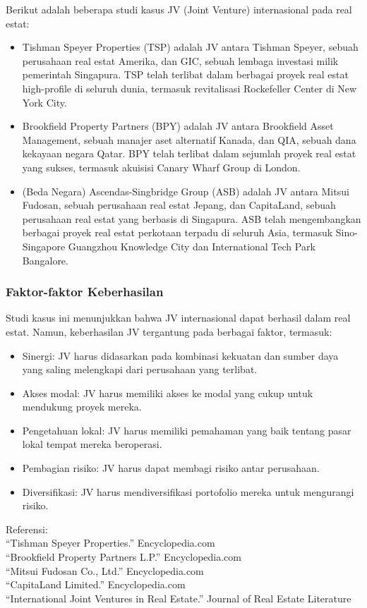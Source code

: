 \documentclass[12pt]{article}
\begin{document}
Berikut adalah beberapa studi kasus JV (Joint Venture) internasional pada real estat:
\begin{itemize}
  \item Tishman Speyer Properties (TSP) adalah JV antara Tishman Speyer, sebuah perusahaan real estat Amerika, dan GIC, sebuah lembaga investasi milik pemerintah Singapura. TSP telah terlibat dalam berbagai proyek real estat high-profile di seluruh dunia, termasuk revitalisasi Rockefeller Center di New York City.
  \item  Brookfield Property Partners (BPY) adalah JV antara Brookfield Asset Management, sebuah manajer aset alternatif Kanada, dan QIA, sebuah dana kekayaan negara Qatar. BPY telah terlibat dalam sejumlah proyek real estat yang sukses, termasuk akuisisi Canary Wharf Group di London.
  \item (Beda Negara) Ascendas-Singbridge Group (ASB) adalah JV antara Mitsui Fudosan, sebuah perusahaan real estat Jepang, dan CapitaLand, sebuah perusahaan real estat yang berbasis di Singapura. ASB telah mengembangkan berbagai proyek real estat perkotaan terpadu di seluruh Asia, termasuk Sino-Singapore Guangzhou Knowledge City dan International Tech Park Bangalore.
  
\end{itemize}

\subsubsection*{Faktor-faktor Keberhasilan}

Studi kasus ini menunjukkan bahwa JV internasional dapat berhasil dalam real estat. Namun, keberhasilan JV tergantung pada berbagai faktor, termasuk:
\begin{itemize}
  
  \item Sinergi: JV harus didasarkan pada kombinasi kekuatan dan sumber daya yang saling melengkapi dari perusahaan yang terlibat.
  \item Akses modal: JV harus memiliki akses ke modal yang cukup untuk mendukung proyek mereka.
  \item Pengetahuan lokal: JV harus memiliki pemahaman yang baik tentang pasar lokal tempat mereka beroperasi.
  \item Pembagian risiko: JV harus dapat membagi risiko antar perusahaan.
  \item Diversifikasi: JV harus mendiversifikasi portofolio mereka untuk mengurangi risiko.
\end{itemize}
\noindent
Referensi:\\
“Tishman Speyer Properties.” Encyclopedia.com \\
“Brookfield Property Partners L.P.” Encyclopedia.com \\
“Mitsui Fudosan Co., Ltd.” Encyclopedia.com \\
“CapitaLand Limited.” Encyclopedia.com \\
“International Joint Ventures in Real Estate.” Journal of Real Estate Literature \\


\printbibliography[title=Daftar Pustaka]
\end{document}
